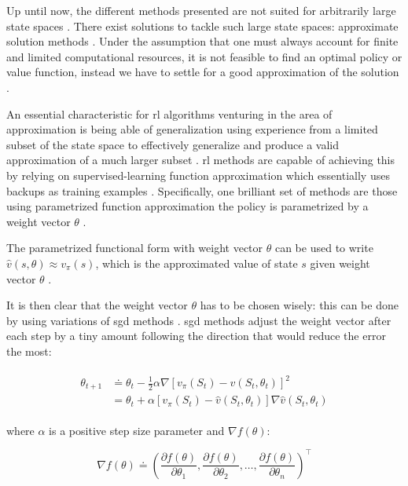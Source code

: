 Up until now, the different methods presented are not suited for arbitrarily large state spaces \citep{Sutton2017}. There exist solutions to tackle such large state spaces: approximate solution methods \citep{Sutton2017}. Under the assumption that one must always account for finite and limited computational resources, it is not feasible to find an optimal policy or value function, instead we have to settle for a good approximation of the solution \citep[p. 189]{Sutton2017}.

An essential characteristic for \gls{rl} algorithms venturing in the area of approximation is being able of generalization \ie using experience from a limited subset of the state space to effectively generalize and produce a valid approximation of a much larger subset  \citep[p. 189]{Sutton2017}. \gls{rl} methods are capable of achieving this by relying on supervised-learning function approximation which essentially uses backups as training examples \citep[p. 222]{Sutton2017}. Specifically, one brilliant set of methods are those using parametrized function approximation \ie the policy is parametrized by a weight vector $\theta$ \citep{Sutton2017}.

The parametrized functional form with weight vector $\theta$ can be used to write $\hat{v}(s,\theta) \approx v_\pi (s)$, which is the approximated value of state $s$ given weight vector $\theta$ \citep[p. 191]{Sutton2017}.

It is then clear that the weight vector $\theta$ has to be chosen wisely: this can be done by using variations of \gls{sgd} methods \citep[p. 223]{Sutton2017}. \gls{sgd} methods adjust the weight vector after each step by a tiny amount following the direction that would reduce the error the most:

\begin{align}
	\begin{split}
		\theta_{t+1} &\doteq \theta_t - \frac{1}{2} \alpha \nabla [v_\pi (S_t) - \hat{v} (S_t,\theta_t)]^2\\
		&= \theta_t + \alpha  [v_\pi (S_t) - \hat{v} (S_t,\theta_t)] \nabla \hat{v} (S_t,\theta_t)
	\end{split}
\end{align}

where $\alpha$ is a positive step size parameter and $\nabla f(\theta)$:

\begin{equation}
	\nabla f(\theta) \doteq \left( \frac{\partial f(\theta)}{\partial \theta_1}, \frac{\partial f(\theta)}{\partial \theta_2}, \ldots, \frac{\partial f(\theta)}{\partial \theta_n} \right)^\top
\end{equation}

